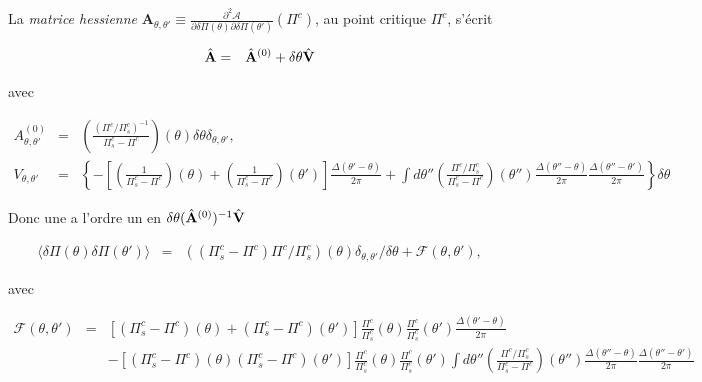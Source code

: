 La {\em matrice hessienne} $\mathbf{A}_{\theta , \theta'} \equiv \frac{\partial^2 \mathcal{A}}{\partial \delta \Pi(\theta) \partial \delta \Pi(\theta') }(\Pi^c)$, au point critique $\Pi^c$, s'écrit

\begin{eqnarray*}
	\hat{\mathbf{A}} & = & \hat{\mathbf{A}}^{(0)} + \delta \theta \hat{\mathbf{V}}
\end{eqnarray*}

avec 

\begin{eqnarray*}
	A^{(0)}_{\theta , \theta'}  & = &  \left ( \frac{ ( \Pi^c/\Pi^c_s)^{-1}}{\Pi^c_s - \Pi^c} \right )(\theta) \delta \theta   \delta_{\theta,\theta '}	,\\
	V_{\theta , \theta'}  &= & \left \{ - \left [ \left ( \frac{1}{\Pi^c_s - \Pi^c } \right ) ( \theta)  + \left ( \frac{1}{\Pi^c_s - \Pi^c } \right ) ( \theta' )\right ] \frac{ \Delta( \theta'- \theta )}{ 2 \pi } + \int d\theta'' \left (   \frac{ \Pi^c/\Pi^c_s}{\Pi^c_s - \Pi^c} \right )(\theta'') \frac{\Delta(\theta''- \theta)}{2 \pi}\frac{\Delta(\theta''- \theta')}{2 \pi}   \right \} \delta \theta	
\end{eqnarray*}

\begin{aff}
Donc une a l'ordre un en $\delta \theta (\hat{\mathbf{A}}^{(0)})^{-1} \hat{\mathbf{V}}$ 

\begin{eqnarray*}
	\langle \delta \Pi ( \theta) \delta \Pi ( \theta') \rangle & = &  ( (\Pi^c_s - \Pi^c)\Pi^c/\Pi^c_s ) ( \theta ) \delta_{\theta, \theta'}/\delta \theta + \mathscr{F}(\theta , \theta' ) ,	
\end{eqnarray*}

avec 

\begin{eqnarray*}
	\mathscr{F}(\theta , \theta' ) & = & \left [ (\Pi^c_s - \Pi^c )( \theta)  +  (\Pi^c_s - \Pi^c ) ( \theta' )\right ] \frac{\Pi^c}{\Pi^c_s}(\theta)\frac{\Pi^c}{\Pi^c_s}(\theta') \frac{ \Delta( \theta'- \theta )}{ 2 \pi }\\
	&&  - \left [ (\Pi^c_s - \Pi^c )( \theta)   (\Pi^c_s - \Pi^c ) ( \theta' )\right ] \frac{\Pi^c}{\Pi^c_s}(\theta)\frac{\Pi^c}{\Pi^c_s}(\theta')\int d\theta'' \left (   \frac{ \Pi^c/\Pi^c_s}{\Pi^c_s - \Pi^c} \right )(\theta'') \frac{\Delta(\theta''- \theta)}{2 \pi}\frac{\Delta(\theta''- \theta')}{2 \pi}  	
\end{eqnarray*}
\end{aff}



 







